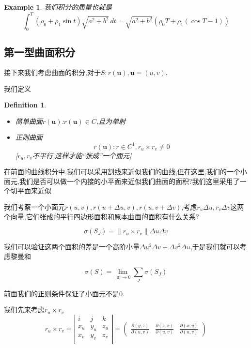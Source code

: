 \documentclass[11pt,hyperref,a4paper,UTF8]{ctexart}
\newtheorem{example}{Example}[subsection]
\newtheorem{definition}{Definition}[subsection]
\newcommand{\abs}[1]{\left|#1\right|}
\newcommand{\ve}{\boldsymbol}
\begin{document}
\begin{CJK}{UTF8}{gkai}
\begin{example}
  我们积分的质量也就是
  \[\int_{0}^{T}(\rho_0 + \rho_1 \sin t) \sqrt{a^2 + b^2}\, dt = \sqrt{a^2 + b^2}(\rho_0 T + \rho_1(\cos T - 1))\]
\end{example}

\subsection{第一型曲面积分}
接下来我们考虑曲面的积分,对于$S: r(\ve{u}), \ve{u} = (u,v)$.

我们定义
\begin{definition}
  \begin{itemize}
    \item 简单曲面$r(\ve{u})$:$r(\ve{u}) \in C$,且为单射
    \item 正则曲面
    \begin{equation}
      r(\ve{u}) :r \in C^1, r_u \times r_v \neq 0
    \label{regularcurve}
    \end{equation}[$r_u , r_v$不平行,这样才能``张成''一个面元]
    \end{itemize}
\end{definition}

在前面的曲线积分中,我们可以采用割线来近似我们的曲线,但在这里,我们的一个小面元,我们是否可以做一个内接的小平面来近似我们曲面的面积?我们这里采用了一个切平面来近似

我们考察一个小面元$r(u,v),r(u + \Delta u, v),r(u,v + \Delta v)$,考虑$r_u \Delta u,r_v \Delta v$这两个向量,它们张成的平行四边形面积和原本曲面的面积有什么关系?

\[\sigma(S_J) = \|r_u \times r_v\| \Delta u \Delta v\]

我们可以验证这两个面积的差是一个高阶小量$\Delta u^2 \Delta v + \Delta v^2 \Delta u$,于是我们就可以考虑黎曼和

\[\sigma(S) = \lim_{|\pi| \to 0} \sum_{J} \sigma(S_J)\]

前面我们的正则条件保证了小面元不是$0$.

我们先来考虑$r_u \times r_v$
\[r_u \times r_v = \abs{\begin{matrix}
  i & j & k\\
  x_u & y_u & z_u\\
  x_v & y_v & z_v\\
\end{matrix}} = \begin{pmatrix}
  \frac{\partial(y,z)}{\partial(u,v)} & \frac{\partial(z,x)}{\partial(u,v)} & \frac{\partial(x,y)}{\partial(u,v)}
\end{pmatrix}\]


\end{CJK}
\end{document}
